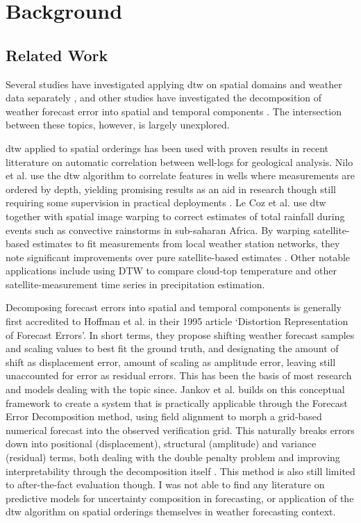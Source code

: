 \chapter{Background}

\section{Related Work}

Several studies have investigated applying \gls{dtw} on spatial domains and 
weather data separately , and other studies have investigated the decomposition
of weather forecast error into spatial and temporal components . The intersection between these 
topics, however, is largely unexplored.

\gls{dtw} applied to spatial orderings has been used with proven results in recent
litterature on automatic correlation between well-logs for geological analysis\cite{well-log-correlation}. 
Nilo et al. use the \gls{dtw} algorithm to correlate features in wells where measurements
are ordered by depth, yielding promising results as an aid in research though still requiring some supervision
in practical deployments \cite{well-log-correlation}. Le Coz et al. use \gls{dtw} together with spatial 
image warping to correct estimates of total rainfall during events such as convective rainstorms in sub-saharan Africa.
By warping satellite-based estimates to fit measurements from local weather station networks, they note significant 
improvements over pure satellite-based estimates \cite{gauge-adjustment}. Other notable applications include using DTW
to compare cloud-top temperature and other satellite-measurement time series in precipitation estimation. \cite{cloudtops,andes-rainfall} 

Decomposing forecast errors into spatial and temporal components is generally first accredited to Hoffman et al. in their 
1995 article `Distortion Representation of Forecast Errors'. \cite{hoffman1995,spatiotemporal-forecast-partition}
In short terms, they propose shifting weather forecast samples and scaling values to best fit the ground truth, and designating the amount
of shift as displacement error, amount of scaling as amplitude error, leaving still unaccounted for error as residual errors.\cite{hoffman1995}
This has been the basis of most research and models dealing with the topic since.
Jankov et al. builds on this conceptual framework to create a system that is practically applicable through the Forecast Error Decomposition method, 
using field alignment to morph a grid-based numerical forecast into the observed verification grid. This naturally breaks errors down into 
positional (displacement), structural (amplitude) and variance (residual) terms, both dealing with the double penalty problem and 
improving interpretability through the decomposition itself \cite{spatiotemporal-forecast-partition}. This method is also still limited to after-the-fact evaluation though. I was not able to find any literature on
predictive models for uncertainty composition in forecasting, or application of the \gls{dtw} algorithm on spatial orderings themselves in weather forecasting context.



